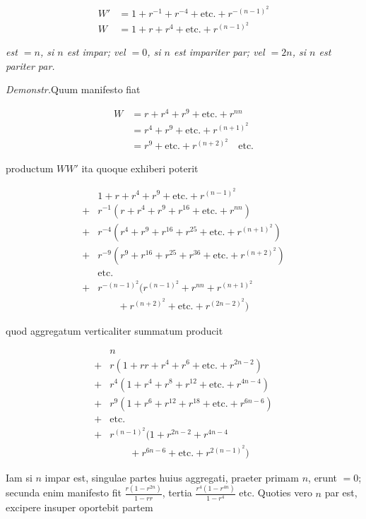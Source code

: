 \[
\begin{aligned}
W'&=1+r^{-1}+r^{-4}+\text{etc.}+r^{-(n-1)^2}\\
W&=1+r+r^4+\text{etc.}+r^{(n-1)^2}
\end{aligned}
\]

\textit{est $=n$, si $n$ est impar; vel $=0$, si $n$ est impariter par; vel $=2n$, si $n$ est} \textit{pariter par.}

\textit{Demonstr.}\quad Quum manifesto fiat

\[
\begin{aligned}
W&=r+r^4+r^9+\text{etc.}+r^{nn}\\
&=r^4+r^9+\text{etc.}+r^{(n+1)^2}\\
&=r^9+\text{etc.}+r^{(n+2)^2}\quad\text{etc.}
\end{aligned}
\]

productum $WW'$ ita quoque exhiberi poterit

\[
\begin{aligned}
&1+r+r^4+r^9+\text{etc.}+r^{(n-1)^2}\\
+{}&r^{-1}(r+r^4+r^9+r^{16}+\text{etc.}+r^{nn})\\
+{}&r^{-4}(r^4+r^9+r^{16}+r^{25}+\text{etc.}+r^{(n+1)^2})\\
+{}&r^{-9}(r^9+r^{16}+r^{25}+r^{36}+\text{etc.}+r^{(n+2)^2})\\
&\text{etc.}\\
+{}&r^{-(n-1)^2}(r^{(n-1)^2}+r^{nn}+r^{(n+1)^2}\\&\qquad+r^{(n+2)^2}+\text{etc.}+r^{(2n-2)^2})
\end{aligned}
\]

quod aggregatum verticaliter summatum producit

\[
\begin{aligned}
&n\\
+{}&r(1+rr+r^4+r^6+\text{etc.}+r^{2n-2})\\
+{}&r^4(1+r^4+r^8+r^{12}+\text{etc.}+r^{4n-4})\\
+{}&r^9(1+r^6+r^{12}+r^{18}+\text{etc.}+r^{6n-6})\\
+{}&\text{etc.}\\
+{}&r^{(n-1)^2}(1+r^{2n-2}+r^{4n-4}\\&\qquad+r^{6n-6}+\text{etc.}+r^{2(n-1)^2})
\end{aligned}
\]

Iam si $n$ impar est, singulae partes huius aggregati, praeter primam $n$, erunt $=0$; secunda enim manifesto fit $\frac{r(1-r^{2n})}{1-rr}$, tertia $\frac{r^4(1-r^{4n})}{1-r^4}$ etc. Quoties vero $n$ par est, excipere insuper oportebit partem


